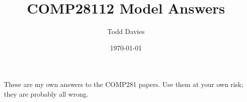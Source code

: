 \documentclass{article}
\author{Todd Davies}
\title{COMP28112 Model Answers}
\date{\today}
\begin{document}
\lhead{\today}

\maketitle

\begin{center}
  These are my own answers to the COMP281 papers. Use them at your own risk;
  they are probably all wrong.
\end{center}


\end{document}
